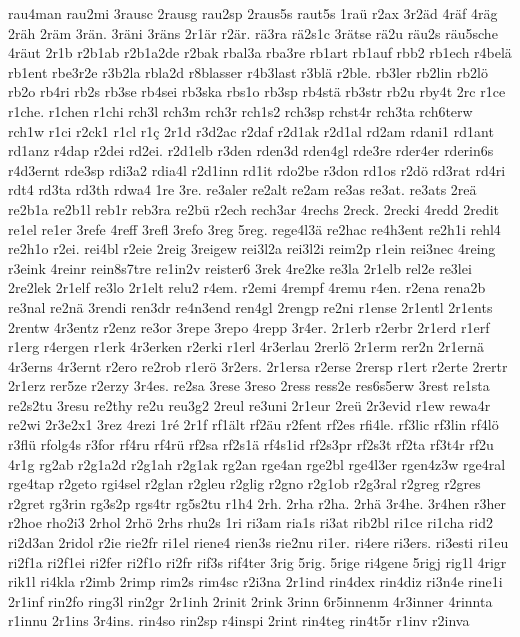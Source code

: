 {rau4man
rau2mi
3rausc
2rausg
rau2sp
2raus5s
raut5s
1raü
r2ax
3r2äd
4räf
4räg
2räh
2räm
3rän.
3räni
3räns
2r1är
r2är.
rä3ra
rä2s1c
3rätse
rä2u
räu2s
räu5sche
4räut
2r1b
r2b1ab
r2b1a2de
r2bak
rbal3a
rba3re
rb1art
rb1auf
rbb2
rb1ech
r4belä
rb1ent
rbe3r2e
r3b2la
rbla2d
r8blasser
r4b3last
r3blä
r2ble.
rb3ler
rb2lin
rb2lö
rb2o
rb4ri
rb2s
rb3se
rb4sei
rb3ska
rbs1o
rb3sp
rb4stä
rb3str
rb2u
rby4t
2rc
r1ce
r1che.
r1chen
r1chi
rch3l
rch3m
rch3r
rch1s2
rch3sp
rchst4r
rch3ta
rch6terw
rch1w
r1ci
r2ck1
r1cl
r1ç
2r1d
r3d2ac
r2daf
r2d1ak
r2d1al
rd2am
rdani1
rd1ant
rd1anz
r4dap
r2dei
rd2ei.
r2d1elb
r3den
rden3d
rden4gl
rde3re
rder4er
rderin6s
r4d3ernt
rde3sp
rdi3a2
rdia4l
r2d1inn
rd1it
rdo2be
r3don
rd1os
r2dö
rd3rat
rd4ri
rdt4
rd3ta
rd3th
rdwa4
1re
3re.
re3aler
re2alt
re2am
re3as
re3at.
re3ats
2reä
re2b1a
re2b1l
reb1r
reb3ra
re2bü
r2ech
rech3ar
4rechs
2reck.
2recki
4redd
2redit
re1el
re1er
3refe
4reff
3refl
3refo
3reg
5reg.
rege4l3ä
re2hac
re4h3ent
re2h1i
rehl4
re2h1o
r2ei.
rei4bl
r2eie
2reig
3reigew
rei3l2a
rei3l2i
reim2p
r1ein
rei3nec
4reing
r3eink
4reinr
rein8s7tre
re1in2v
reister6
3rek
4re2ke
re3la
2r1elb
rel2e
re3lei
2re2lek
2r1elf
re3lo
2r1elt
relu2
r4em.
r2emi
4rempf
4remu
r4en.
r2ena
rena2b
re3nal
re2nä
3rendi
ren3dr
re4n3end
ren4gl
2rengp
re2ni
r1ense
2r1entl
2r1ents
2rentw
4r3entz
r2enz
re3or
3repe
3repo
4repp
3r4er.
2r1erb
r2erbr
2r1erd
r1erf
r1erg
r4ergen
r1erk
4r3erken
r2erki
r1erl
4r3erlau
2rerlö
2r1erm
rer2n
2r1ernä
4r3erns
4r3ernt
r2ero
re2rob
r1erö
3r2ers.
2r1ersa
r2erse
2rersp
r1ert
r2erte
2rertr
2r1erz
rer5ze
r2erzy
3r4es.
re2sa
3rese
3reso
2ress
ress2e
res6s5erw
3rest
re1sta
re2s2tu
3resu
re2thy
re2u
reu3g2
2reul
re3uni
2r1eur
2reü
2r3evid
r1ew
rewa4r
re2wi
2r3e2x1
3rez
4rezi
1ré
2r1f
rf1ält
rf2äu
r2fent
rf2es
rfi4le.
rf3lic
rf3lin
rf4lö
r3flü
rfolg4s
r3for
rf4ru
rf4rü
rf2sa
rf2s1ä
rf4s1id
rf2s3pr
rf2s3t
rf2ta
rf3t4r
rf2u
4r1g
rg2ab
r2g1a2d
r2g1ah
r2g1ak
rg2an
rge4an
rge2bl
rge4l3er
rgen4z3w
rge4ral
rge4tap
r2geto
rgi4sel
r2glan
r2gleu
r2glig
r2gno
r2g1ob
r2g3ral
r2greg
r2gres
r2gret
rg3rin
rg3s2p
rgs4tr
rg5s2tu
r1h4
2rh.
2rha
r2ha.
2rhä
3r4he.
3r4hen
r3her
r2hoe
rho2i3
2rhol
2rhö
2rhs
rhu2s
1ri
ri3am
ria1s
ri3at
rib2bl
ri1ce
ri1cha
rid2
ri2d3an
2ridol
r2ie
rie2fr
ri1el
riene4
rien3s
rie2nu
ri1er.
ri4ere
ri3ers.
ri3esti
ri1eu
ri2f1a
ri2f1ei
ri2fer
ri2f1o
ri2fr
rif3s
rif4ter
3rig
5rig.
5rige
ri4gene
5rigj
rig1l
4rigr
rik1l
ri4kla
r2imb
2rimp
rim2s
rim4sc
r2i3na
2r1ind
rin4dex
rin4diz
ri3n4e
rine1i
2r1inf
rin2fo
ring3l
rin2gr
2r1inh
2rinit
2rink
3rinn
6r5innenm
4r3inner
4rinnta
r1innu
2r1ins
3r4ins.
rin4so
rin2sp
r4inspi
2rint
rin4teg
rin4t5r
r1inv
r2inva
}
